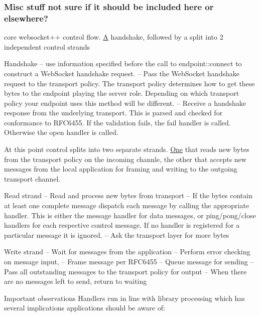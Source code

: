 \subsubsection*{Misc stuff not sure if it should be included here or elsewhere?}

core websocket++ control flow. \mbox{\hyperlink{struct_a}{A}} handshake, followed by a split into 2 independent control strands
\begin{DoxyItemize}
\item Handshake -- use information specified before the call to endpoint\+::connect to construct a Web\+Socket handshake request. -- Pass the Web\+Socket handshake request to the transport policy. The transport policy determines how to get these bytes to the endpoint playing the server role. Depending on which transport policy your endpoint uses this method will be different. -- Receive a handshake response from the underlying transport. This is parsed and checked for conformance to R\+F\+C6455. If the validation fails, the fail handler is called. Otherwise the open handler is called.
\item At this point control splits into two separate strands. \mbox{\hyperlink{struct_one}{One}} that reads new bytes from the transport policy on the incoming channle, the other that accepts new messages from the local application for framing and writing to the outgoing transport channel.
\item Read strand -- Read and process new bytes from transport -- If the bytes contain at least one complete message dispatch each message by calling the appropriate handler. This is either the message handler for data messages, or ping/pong/close handlers for each respective control message. If no handler is registered for a particular message it is ignored. -- Ask the transport layer for more bytes
\item Write strand -- Wait for messages from the application -- Perform error checking on message input, -- Frame message per R\+F\+C6455 -- Queue message for sending -- Pass all outstanding messages to the transport policy for output -- When there are no messages left to send, return to waiting
\end{DoxyItemize}

Important observations Handlers run in line with library processing which has several implications applications should be aware of\+: 